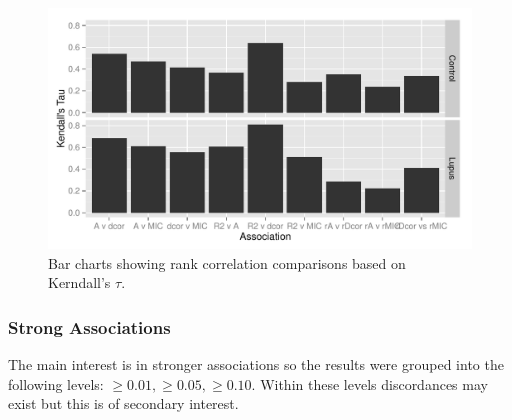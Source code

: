 \documentclass[a4paper, 12pt]{report}
\begin{document}
\begin{figure}[H]
\begin{centering}
\includegraphics[width=\textwidth]{kendall2.pdf}
\caption{Bar charts showing rank correlation comparisons based on Kerndall's $\tau$.} 
\label{F:kendall}
\end{centering}
\end{figure}

%

\subsubsection{Strong Associations}
The main interest is in stronger associations so the results were grouped into the following levels: $\ge 0.01, \ge 0.05, \ge 0.10$. Within these levels discordances may exist but this is of secondary interest.
\end{document}
